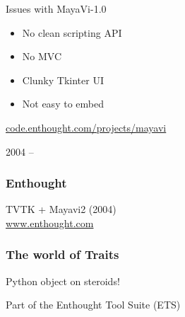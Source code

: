 \begin{frame}{Issues with MayaVi-1.0}
    \Large
    \begin{center}
        \begin{itemize}
            \item No clean scripting API
            \item No MVC
            \item Clunky Tkinter UI
            \item Not easy to embed
        \end{itemize}
    \end{center}
\end{frame}

\begin{frame}
    \Huge
    \begin{center}
    \vspace*{0.5in}

    \normalsize
    \url{code.enthought.com/projects/mayavi}

    \vspace*{0.2in}
    2004 --
    \end{center}
\end{frame}

\begin{frame}[plain]
    \Large
    \begin{center}
        \vspace*{3in}
        {}
    \end{center}
\end{frame}

\begin{frame}
    \frametitle{Enthought}
    \Large
    \begin{center}
        TVTK + Mayavi2 (2004)\\
        \vspace*{1in}
    \large
    \url{www.enthought.com}
    \end{center}
\end{frame}

\begin{frame}
    \frametitle{The world of Traits}
    \Large
    \begin{center}
        Python object on steroids!

        \vspace*{1in}
        Part of the Enthought Tool Suite (ETS)
    \end{center}
\end{frame}

